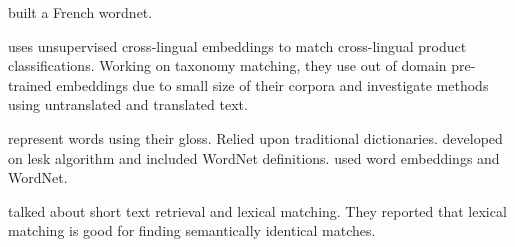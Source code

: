 \textcite{sagot_building_2008} built a French wordnet.

\textcite{gordeev_unsupervised_2018} uses unsupervised cross-lingual embeddings to match cross-lingual product classifications.
Working on taxonomy matching, they use out of domain pre-trained embeddings due to small size of their corpora and investigate methods using untranslated and translated text.

\textcite{lesk_automatic_1986} represent words using their gloss.
Relied upon traditional dictionaries.
\textcite{banerjee_adapted_2002} developed on lesk algorithm and included WordNet definitions.
\textcite{khodak_automated_2017} used word embeddings and WordNet.

\textcite{metzler_similarity_2007} talked about short text retrieval and lexical matching.
They reported that lexical matching is good for finding semantically identical matches.
